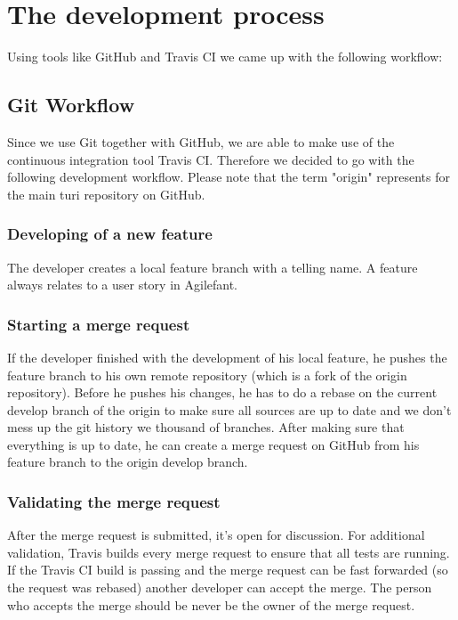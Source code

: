 \documentclass[a4paper]{article}
\begin{document}
\section{The development process}

Using tools like GitHub and Travis CI we came up with the following workflow:

\subsection{Git Workflow}
Since we use Git together with GitHub, we are able to make use of the continuous integration tool Travis CI. Therefore we decided to go with the following development workflow. Please note that the term "origin" represents for the main turi repository on GitHub.

\subsubsection{Developing of a new feature}
The developer creates a local feature branch with a telling name. A feature always relates to a user story in Agilefant.

\subsubsection{Starting a merge request}
If the developer finished with the development of his local feature, he pushes the feature branch to his own remote repository (which is a fork of the origin repository). Before he pushes his changes, he has to do a rebase on the current develop branch of the origin to make sure all sources are up to date and we don't mess up the git history we thousand of branches. After making sure that everything is up to date, he can create a merge request on GitHub from his feature branch to the origin develop branch.

\subsubsection{Validating the merge request}
After the merge request is submitted, it's open for discussion. For additional validation, Travis builds every merge request to ensure that all tests are running. If the Travis CI build is passing and the merge request can be fast forwarded (so the request was rebased) another developer can accept the merge. The person who accepts the merge should be never be the owner of the merge request.
\end{document}
